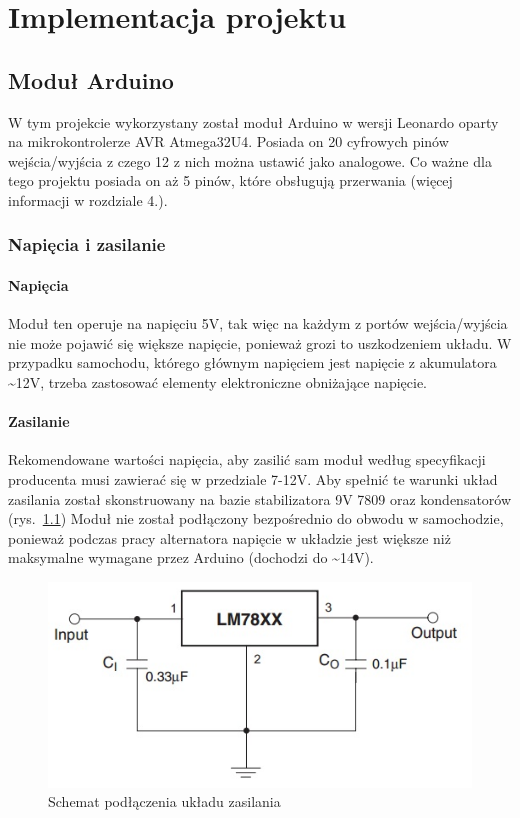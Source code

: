 \chapter{Implementacja projektu}
\section{Moduł Arduino}
W tym projekcie wykorzystany został moduł Arduino w wersji Leonardo oparty na mikrokontrolerze AVR Atmega32U4. Posiada on 20 cyfrowych pinów wejścia/wyjścia z czego 12 z nich można ustawić jako analogowe. Co ważne dla tego projektu posiada on aż 5 pinów, które obsługują przerwania (więcej informacji w rozdziale 4.).
\subsection{Napięcia i zasilanie}
\subsubsection{Napięcia}
Moduł ten operuje na napięciu 5V, tak więc na każdym z portów wejścia/wyjścia nie może pojawić się większe napięcie, ponieważ grozi to uszkodzeniem układu. W przypadku samochodu, którego głównym napięciem jest napięcie z akumulatora \textasciitilde12V, trzeba zastosować elementy elektroniczne obniżające napięcie.
\subsubsection{Zasilanie}
Rekomendowane wartości napięcia, aby zasilić sam moduł według specyfikacji producenta musi zawierać się w przedziale 7-12V. Aby spełnić te warunki układ zasilania został skonstruowany na bazie stabilizatora 9V 7809 oraz kondensatorów (rys.~\ref{fig:LM78XX}) Moduł nie został podłączony bezpośrednio do obwodu w samochodzie, ponieważ podczas pracy alternatora napięcie w układzie jest większe niż maksymalne wymagane przez Arduino (dochodzi do \textasciitilde14V).

\begin{figure}[ht]
\centering
\includegraphics[width=0.7\linewidth]{Rysunki/78xx.jpg}
\caption{Schemat podłączenia układu zasilania \cite{LM78XX}}
\label{fig:LM78XX}
\end{figure}

